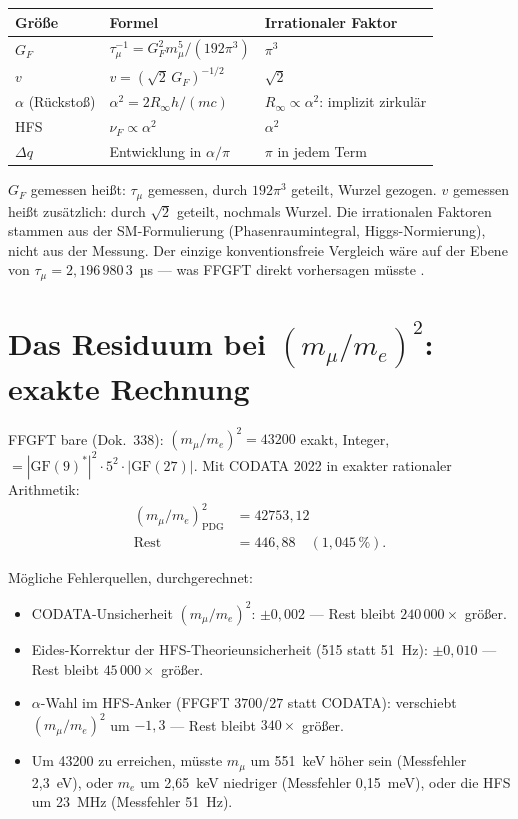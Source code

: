 \begin{center}
\begin{tabular}{@{}lll@{}}
\toprule
Größe & Formel & Irrationaler Faktor \\
\midrule
$G_F$ & $\tau_\mu^{-1}=G_F^2m_\mu^5/(192\pi^3)$ & $\pi^3$ \\
$v$ & $v=(\sqrt2\,G_F)^{-1/2}$ & $\sqrt2$ \\
$\alpha$ (Rückstoß) & $\alpha^2=2R_\infty h/(mc)$ & $R_\infty\propto\alpha^2$: implizit zirkulär \\
HFS & $\nu_F\propto\alpha^2$ & $\alpha^2$ \\
$\Delta q$ & Entwicklung in $\alpha/\pi$ & $\pi$ in jedem Term \\
\bottomrule
\end{tabular}
\end{center}

\glqq$G_F$ gemessen\grqq{} heißt: $\tau_\mu$ gemessen, durch $192\pi^3$ geteilt, Wurzel gezogen. \glqq$v$ gemessen\grqq{} heißt zusätzlich: durch $\sqrt2$ geteilt, nochmals Wurzel. Die irrationalen Faktoren stammen aus der SM-Formulierung (Phasenraumintegral, Higgs-Normierung), nicht aus der Messung. Der einzige konventionsfreie Vergleich wäre auf der Ebene von $\tau_\mu=2{,}196\,980\,3$~µs --- was FFGFT direkt vorhersagen müsste \SM.

\section{Das Residuum bei $(m_\mu/m_e)^2$: exakte Rechnung}

FFGFT bare (Dok.~338): $(m_\mu/m_e)^2=43200$ exakt, Integer,
$=|\text{GF}(9)^*|^2\cdot5^2\cdot|\text{GF}(27)|$. Mit CODATA 2022
in exakter rationaler Arithmetik:
\begin{align}
(m_\mu/m_e)^2_\text{PDG} &= 42753{,}12 \\
\text{Rest} &= 446{,}88\quad(1{,}045\,\%) .
\end{align}

Mögliche Fehlerquellen, durchgerechnet:
\begin{itemize}\itemsep2pt
\item CODATA-Unsicherheit $(m_\mu/m_e)^2$: $\pm0{,}002$ --- Rest bleibt
  $240\,000\times$ größer.
\item Eides-Korrektur der HFS-Theorieunsicherheit (515 statt 51~Hz):
  $\pm0{,}010$ --- Rest bleibt $45\,000\times$ größer.
\item $\alpha$-Wahl im HFS-Anker (FFGFT $3700/27$ statt CODATA):
  verschiebt $(m_\mu/m_e)^2$ um $-1{,}3$ --- Rest bleibt
  $340\times$ größer.
\item Um 43200 zu erreichen, müsste $m_\mu$ um 551~keV höher sein
  (Messfehler 2{,}3~eV), oder $m_e$ um 2{,}65~keV niedriger
  (Messfehler 0{,}15~meV), oder die HFS um 23~MHz
  (Messfehler 51~Hz).
\end{itemize}

